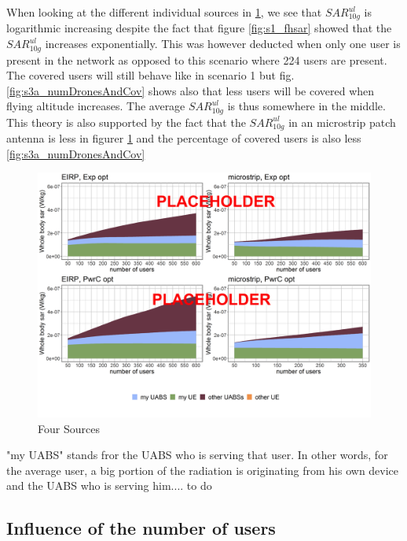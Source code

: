 When looking at the different individual sources in \ref{fig:s3a_fourSourcesMatrix}, we see 
that $SAR_{10g}^{ul}$ is logarithmic increasing despite the fact that figure \ref{fig:s1_fhsar} showed that the $SAR_{10g}^{ul}$
increases exponentially. This was however deducted when only one user is present in the network as opposed to this scenario 
where 224 users are present. The covered users will still behave like in scenario 1 but fig. \ref{fig:s3a_numDronesAndCov} 
shows also that less users will be covered when flying altitude increases. The average $SAR_{10g}^{ul}$ is thus somewhere in the middle.
This theory is also supported by the fact that the $SAR_{10g}^{ul}$ in an microstrip patch antenna is less in figurer \ref{fig:s3a_fourSourcesMatrix} 
and the percentage of covered users is also less \ref{fig:s3a_numDronesAndCov}

\begin{figure}[]
  \includegraphics[width=\textwidth]{../results/s3/fhFourSources.png}
  \caption{Four Sources}
  \label{fig:s3a_fourSourcesMatrix}
\end{figure}

"my UABS" stands fror the UABS who is serving that user. In other words, for the average user, a big portion of the radiation is originating from his own 
device and the UABS who is serving him.... to do
\FloatBarrier
\subsection{Influence of the number of users}
\label{S3B}

